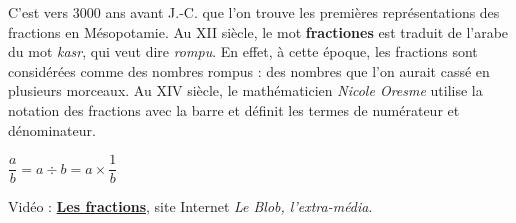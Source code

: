 \vspace*{-7mm}

\vspace*{-3mm}
\begin{debat} 
   C'est vers 3000 ans avant J.-C. que l'on trouve les premières représentations des fractions en Mésopotamie. Au {\small XII} siècle, le mot {\bf fractiones} est traduit de l'arabe du mot {\it kasr}, qui veut dire {\it rompu}. En effet, à cette époque, les fractions sont considérées comme des nombres rompus : des nombres que l'on aurait cassé en plusieurs morceaux. Au {\small XIV} siècle, le mathématicien {\it Nicole Oresme} utilise la notation des fractions avec la barre et définit les termes de numérateur et dénominateur.
   \begin{center}
      \textcolor{B1}{\fontsize{30}{30}\selectfont $\dfrac{a}{b} =a\div b =a\times\dfrac{1}{b}$}
   \end{center}
   \bigskip
   \begin{cadre}[B2][F4]
      \begin{center}
         Vidéo : \href{https://leblob.fr/fondamental/les-fractions}{\bf Les fractions}, site Internet {\it Le Blob, l'extra-média}.
      \end{center}
   \end{cadre}
\end{debat}
